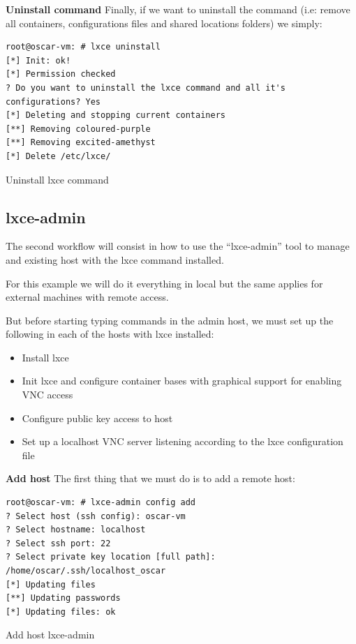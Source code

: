 \textbf{Uninstall command}
Finally, if we want to uninstall the command (i.e: remove all containers, configurations files and shared locations folders) we simply:
\begin{listing}[H]
\begin{verbatim}
root@oscar-vm: # lxce uninstall
[*] Init: ok!
[*] Permission checked
? Do you want to uninstall the lxce command and all it's configurations? Yes
[*] Deleting and stopping current containers
[**] Removing coloured-purple
[**] Removing excited-amethyst
[*] Delete /etc/lxce/
\end{verbatim}
\caption[lxce uninstall]{\footnotesize{Uninstall lxce command}}
\end{listing}


\subsection{lxce-admin}
The second workflow will consist in how to use the ``lxce-admin'' tool to manage and existing host with the lxce command installed.

For this example we will do it everything in local but the same applies for external machines with remote access.

But before starting typing commands in the admin host, we must set up the following in each of the hosts with lxce installed:
\begin{itemize}
	\item{Install lxce}
	\item{Init lxce and configure container bases with graphical support for enabling VNC access}
	\item{Configure public key access to host}
	\item{Set up a localhost VNC server listening according to the lxce configuration file}
\end{itemize}

\textbf{Add host}
The first thing that we must do is to add a remote host:
\begin{listing}[H]
\begin{verbatim}
root@oscar-vm: # lxce-admin config add
? Select host (ssh config): oscar-vm
? Select hostname: localhost
? Select ssh port: 22
? Select private key location [full path]: /home/oscar/.ssh/localhost_oscar
[*] Updating files
[**] Updating passwords
[*] Updating files: ok
\end{verbatim}
\caption[lxce-admin config add]{\footnotesize{Add host lxce-admin}}
\end{listing}

